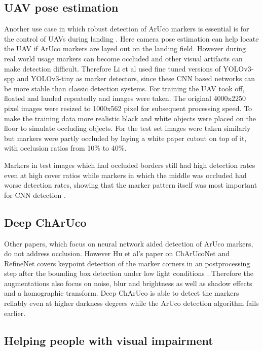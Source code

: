 \documentclass[10pt]{book}
\begin{document}
\subsection{UAV pose estimation}

Another use case in which robust detection of \ac{ArUco} markers is essential is for the control of \acp{UAV} during landing \cite{li2020aruco}. Here camera pose estimation can help locate the \ac{UAV} if \ac{ArUco} markers are layed out on the landing field. However during real world usage markers can become occluded and other visual artifacts can make detection difficult. Therefore Li et al used fine tuned versions of \ac{YOLO}v3-spp and \ac{YOLO}v3-tiny as marker detectors, since these \ac{CNN} based networks can be more stable than classic detection systems. For training the \ac{UAV} took off, floated and landed repeatedly and images were taken. The original 4000x2250 pixel images were resized to 1000x562 pixel for subsequent processing speed. To make the training data more realistic black and white objects were placed on the floor to simulate occluding objects. For the test set images were taken similarly but markers were partly occluded by laying a white paper cutout on top of it, with occlusion ratios from 10\% to 40\%. 

Markers in test images which had occluded borders still had high detection rates even at high cover ratios while markers in which the middle was occluded had worse detection rates, showing that the marker pattern itself was most important for \ac{CNN} detection \cite{li2020aruco}.

\subsection{Deep ChArUco}

Other papers, which focus on neural network aided detection of \ac{ArUco} markers, do not address occlusion. However Hu et al's paper on ChArUcoNet and RefineNet covers keypoint detection of the marker corners in an postprocessing step after the bounding box detection under low light conditions \cite{hu2019deep}. Therefore the augmentations also focus on noise, blur and brightness as well as shadow effects and a homographic transform. Deep ChArUco is able to detect the markers reliably even at higher darkness degrees while the \ac{ArUco} detection algorithm fails earlier. 

\subsection{Helping people with visual impairment}
\end{document}
